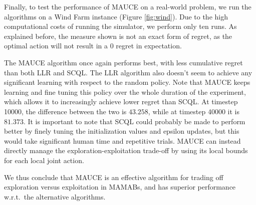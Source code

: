 Finally, to test the performance of MAUCE on a real-world problem, we run the algorithms on a Wind
Farm instance (Figure \ref{fig:wind}). Due to the high computational costs of running the simulator,
we perform only ten runs. As explained before, the measure shown is not an exact form of regret, as
the optimal action will not result in a $0$ regret in expectation.

The MAUCE algorithm once again performs best, with less cumulative regret than both LLR and SCQL.
The LLR algorithm also doesn't seem to achieve any significant learning with respect to the random
policy. Note that MAUCE keeps learning and fine tuning this policy over the whole duration of the
experiment, which allows it to increasingly achieve lower regret than SCQL. At timestep 10000, the
difference between the two is $43.258$, while at timestep 40000 it is $81.373$.  It is important to
note that SCQL could probably be made to perform better by finely tuning the initialization values
and epsilon updates, but this would take significant human time and repetitive trials. MAUCE can
instead directly manage the exploration-exploitation trade-off by using its local bounds for each
local joint action.

We thus conclude that MAUCE is an effective algorithm for trading off exploration versus exploitation in MAMABs, and has superior performance w.r.t.\ the alternative algorithms.


